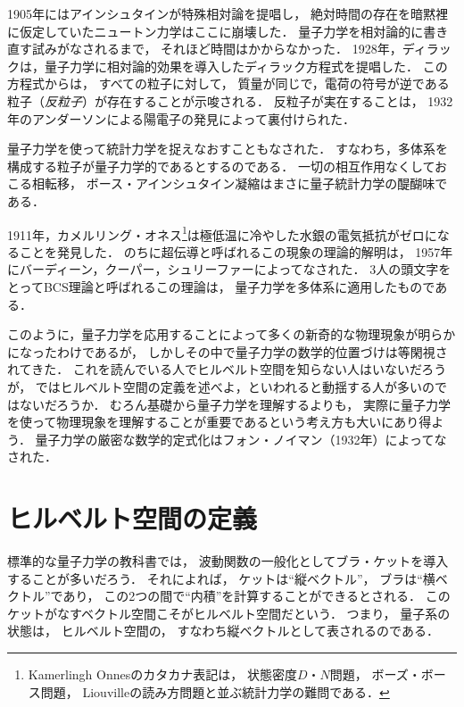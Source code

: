 \documentclass[
]{sotsu}
\begin{document}
1905年にはアインシュタインが特殊相対論を提唱し，
絶対時間の存在を暗黙裡に仮定していたニュートン力学はここに崩壊した．
量子力学を相対論的に書き直す試みがなされるまで，
それほど時間はかからなかった．
1928年，ディラックは，量子力学に相対論的効果を導入したディラック方程式を提唱した．
この方程式からは，
すべての粒子に対して，
質量が同じで，電荷の符号が逆である粒子（\emph{反粒子}）が存在することが示唆される．
反粒子が実在することは，
1932年のアンダーソンによる陽電子の発見によって裏付けられた．


量子力学を使って統計力学を捉えなおすこともなされた．
すなわち，多体系を構成する粒子が量子力学的であるとするのである．
一切の相互作用なくしておこる相転移，
ボース・アインシュタイン凝縮はまさに量子統計力学の醍醐味である．


1911年，カメルリング・オネス\footnote{
    Kamerlingh Onnesのカタカナ表記は，
    状態密度$D$・$N$問題，
    ボーズ・ボース問題，
    Liouvilleの読み方問題と並ぶ統計力学の難問である．
}は極低温に冷やした水銀の電気抵抗がゼロになることを発見した．
のちに超伝導と呼ばれるこの現象の理論的解明は，
1957年にバーディーン，クーパー，シュリーファーによってなされた．
3人の頭文字をとってBCS理論と呼ばれるこの理論は，
量子力学を多体系に適用したものである．


このように，量子力学を応用することによって多くの新奇的な物理現象が明らかになったわけであるが，
しかしその中で量子力学の数学的位置づけは等閑視されてきた．
これを読んでいる人でヒルベルト空間を知らない人はいないだろうが，
ではヒルベルト空間の定義を述べよ，といわれると動揺する人が多いのではないだろうか．
むろん基礎から量子力学を理解するよりも，
実際に量子力学を使って物理現象を理解することが重要であるという考え方も大いにあり得よう．
量子力学の厳密な数学的定式化はフォン・ノイマン（1932年）によってなされた．







\section{ヒルベルト空間の定義}
\label{sec:what-is-Hilbert-space}

標準的な量子力学の教科書では，
波動関数の一般化としてブラ・ケットを導入することが多いだろう．
それによれば，
ケットは``縦ベクトル''，
ブラは``横ベクトル''であり，
この2つの間で``内積''を計算することができるとされる．
このケットがなすベクトル空間こそがヒルベルト空間だという．
つまり，
量子系の状態は，
ヒルベルト空間の，
すなわち縦ベクトルとして表されるのである．
\end{document}
